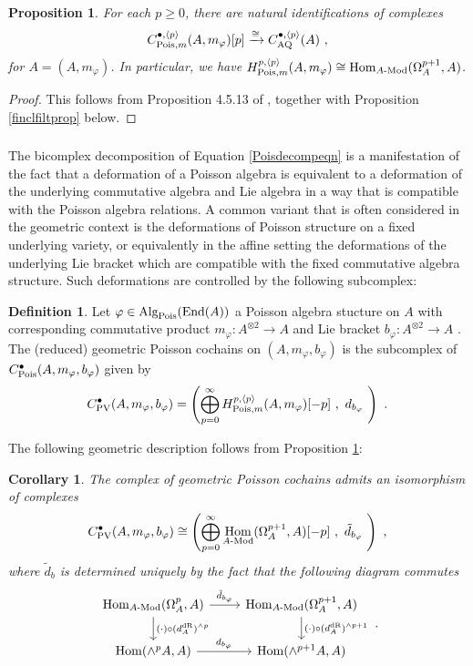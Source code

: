 \documentclass[11pt]{amsart}
\numberwithin{equation}{section}
\newtheorem{prop}[theo]{Proposition}
\newtheorem{coro}[theo]{Corollary}
\theoremstyle{definition}
\newtheorem{defn}[theo]{Definition}
\newcommand{\AQ}{{\textup{AQ}}}
\DeclareMathOperator{\Hom}{Hom}
\newcommand{\Mod}{{\textup{-Mod}}}
\newcommand{\End}{{\textup{End}}}
\newcommand{\dR}{{\textup{dR}}}
\newcommand{\Alg}{{\textup{Alg}}}
\newcommand{\Pois}{{\textup{Pois}}}
\newcommand{\PV}{{{\textup{PV}}}}
\newcommand{\0}{{\textbf{0}}}
\begin{document}
\begin{prop}\label{AQPoisequivprop} For each $p\geq 0$, there are natural identifications of complexes
\[C^{\bullet,\langle p \rangle}_{\Pois,m}(A,m_\varphi)[p] \xrightarrow{\cong} C^{\bullet,\langle p \rangle}_\AQ(A) \ , \]
for $A=(A,m_\varphi)$. In particular, we have $H^{p,\langle p \rangle}_{\Pois,m}(A,m_\varphi) \cong \Hom_{A\Mod}(\Omega^{p+1}_A,A)$.
\end{prop}
\begin{proof} This follows from Proposition 4.5.13 of \cite{Lod}, together with Proposition \ref{finclfiltprop} below.
\end{proof}


\subsubsection{} The bicomplex decomposition of Equation \ref{Poisdecompeqn} is a manifestation of the fact that a deformation of a Poisson algebra is equivalent to a deformation of the underlying commutative algebra and Lie algebra in a way that is compatible with the Poisson algebra relations. A common variant that is often considered in the geometric context is the deformations of Poisson structure on a fixed underlying variety, or equivalently in the affine setting the deformations of the underlying Lie bracket which are compatible with the fixed commutative algebra structure. Such deformations are controlled by the following subcomplex:


\begin{defn}\label{gPCdefn} Let $\varphi \in \Alg_\Pois(\End(A))$ a Poisson algebra stucture on $A$ with corresponding commutative product $m_\varphi:A^{\otimes 2} \to A$ and Lie bracket $b_\varphi:A^{\otimes 2} \to A$ . The (reduced) geometric Poisson cochains on $(A,m_\varphi,b_\varphi)$ is the subcomplex of  $C_\Pois^\bullet(A,m_\varphi,b_\varphi)$ given by
	\[ C^\bullet_\PV(A,m_\varphi,b_\varphi)= \left( \bigoplus_{p=0}^{\infty} H^{p,\langle p \rangle}_{\Pois,m}(A,m_\varphi)[-p] \ , \ d_{b_\varphi}  \ \right)  \ .\]
\end{defn}

The following geometric description follows from Proposition \ref{AQPoisequivprop}:

\begin{coro}\label{gPCcoro} The complex of geometric Poisson cochains admits an isomorphism of complexes
	\[ C^\bullet_\PV(A,m_\varphi,b_\varphi) \cong \left( \bigoplus_{p=0}^\infty\Hom_{A\Mod}(\Omega^{p+1}_A,A)[-p] \ , \ \tilde d_{b_\varphi} \ \right) \ , \]
	where $\tilde d_{b}$ is determined uniquely by the fact that the following diagram commutes
	\begin{equation}\label{tildedbeqn}
		\begin{tikzcd}
		\Hom_{A\Mod}(\Omega^{p}_A,A)\arrow[r,"\tilde d_{b_\varphi}"] \arrow[d," (\cdot)\circ (d_A^{\dR})^{\wedge p}"] & \Hom_{A\Mod}(\Omega^{p+1}_A,A)  \arrow[d," (\cdot)\circ (d_A^{\dR})^{\wedge p+1}"]\\
			\Hom(\wedge^p A,A) \arrow[r,"d_{b_\varphi}"]&  	\Hom(\wedge^{p+1}A,A)	\end{tikzcd}  \ .
	\end{equation}
\end{coro}
\end{document}
